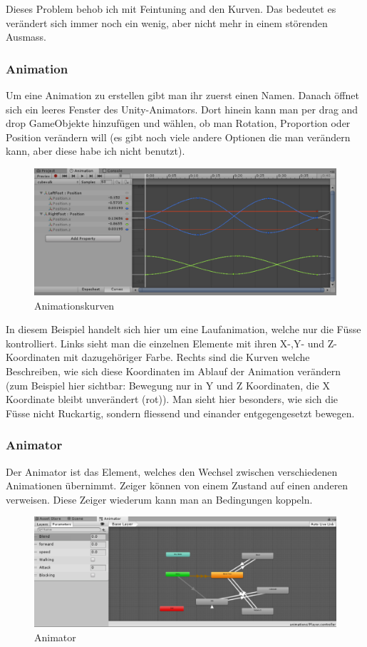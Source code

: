 Dieses Problem behob ich mit Feintuning and den Kurven.
Das bedeutet es verändert sich immer noch ein wenig, aber nicht mehr in einem störenden Ausmass.

\subsubsection{Animation}
Um eine Animation zu erstellen gibt man ihr zuerst einen Namen.
Danach öffnet sich ein leeres Fenster des Unity-Animators.
Dort hinein kann man per drag and drop GameObjekte hinzufügen und wählen, ob man Rotation, Proportion oder Position verändern will (es gibt noch viele andere Optionen die man verändern 
kann, aber diese habe ich nicht benutzt).

\begin{figure}[H]
\includegraphics[scale=0.7]{screenshots/animations.png}
\caption{Animationskurven}
\end{figure}

In diesem Beispiel handelt sich hier um eine Laufanimation, welche nur die Füsse kontrolliert. Links sieht man die einzelnen Elemente mit ihren X-,Y- und Z-Koordinaten mit dazugehöriger Farbe. Rechts sind die Kurven welche Beschreiben, wie sich diese Koordinaten im Ablauf der Animation verändern (zum Beispiel hier sichtbar: Bewegung nur in Y und Z Koordinaten, die X Koordinate bleibt unverändert (rot)).
Man sieht hier besonders, wie sich die Füsse nicht Ruckartig, sondern fliessend und einander entgegengesetzt bewegen.

\subsubsection{Animator}
Der Animator ist das Element, welches den Wechsel zwischen verschiedenen Animationen übernimmt.
Zeiger können von einem Zustand auf einen anderen verweisen.
Diese Zeiger wiederum kann man an Bedingungen koppeln.
\begin{figure}[H]
\includegraphics[scale=0.7]{screenshots/animator.png}
\caption{Animator}
\end{figure}

